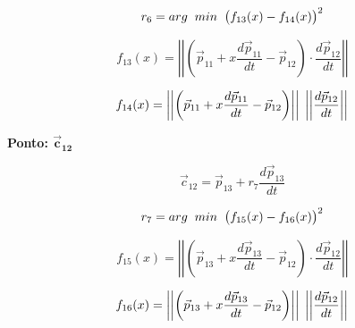 \documentclass[10pt,a4paper]{report}
\begin{document}
\begin{equation}
r_{6} = arg \hspace{0.2cm} min \hspace{0.2cm} \big( f_{13}(x) - f_{14}(x) \big) ^{2}
\label{eq:r6}
\end{equation}

\begin{equation}
f_{13}(x) = \left| \left| \left( \vec{p}_{11} + x \frac{d \vec{p}_{11}}{dt} - \vec{p}_{12} \right) \cdot \frac{d \vec{p}_{12}}{dt} \right| \right|
\label{eq:f13}
\end{equation}

\begin{equation}
f_{14}(x) = \left| \left| \left( \vec{p}_{11} + x \frac{d \vec{p}_{11}}{dt} - \vec{p}_{12} \right) \right| \right| \hspace{0.1cm} \left| \left| \frac{d \vec{p}_{12}}{dt} \right| \right|
\label{eq:f14}
\end{equation}

\textbf{Ponto: {$\boldsymbol{\vec{c}_{12}}$}}

\begin{equation}
\vec{c}_{12} = \vec{p}_{13} + r_{7} \frac{d \vec{p}_{13}}{dt}
\label{eq:c12}
\end{equation}

\begin{equation}
r_{7} = arg \hspace{0.2cm} min \hspace{0.2cm} \big( f_{15}(x) - f_{16}(x) \big) ^{2}
\label{eq:r7}
\end{equation}

\begin{equation}
f_{15}(x) = \left| \left| \left( \vec{p}_{13} + x \frac{d \vec{p}_{13}}{dt} - \vec{p}_{12} \right) \cdot \frac{d \vec{p}_{12}}{dt} \right| \right|
\label{eq:f15}
\end{equation}

\begin{equation}
f_{16}(x) = \left| \left| \left( \vec{p}_{13} + x \frac{d \vec{p}_{13}}{dt} - \vec{p}_{12} \right) \right| \right| \hspace{0.1cm} \left| \left| \frac{d \vec{p}_{12}}{dt} \right| \right|
\label{eq:f16}
\end{equation}
\end{document}
